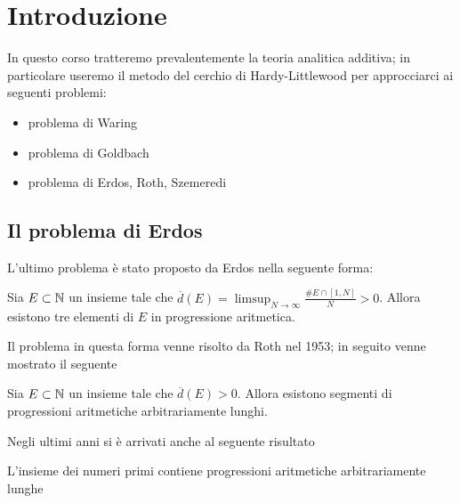 \chapter{Introduzione}
In questo corso tratteremo prevalentemente la teoria analitica additiva; in particolare useremo il metodo del cerchio di Hardy-Littlewood per approcciarci ai seguenti problemi:
\begin{itemize}
    \item problema di Waring
    \item problema di Goldbach
    \item problema di Erdos, Roth, Szemeredi
\end{itemize}
\section{Il problema di Erdos}
L'ultimo problema è stato proposto da Erdos nella seguente forma:
\begin{congettura}[Erdos]
    Sia $E\subset\mathbb{N}$ un insieme tale che $\overline d(E)=\limsup_{N\to\infty}\frac{\# E\cap[1,N]}{N}>0$. Allora esistono tre elementi di $E$ in progressione aritmetica.
\end{congettura}
Il problema in questa forma venne risolto da Roth nel 1953; in seguito venne mostrato il seguente
\begin{theorem}[Szemeredi, 1975]
    Sia $E\subset\mathbb{N}$ un insieme tale che $\overline d(E)>0$. Allora esistono segmenti di progressioni aritmetiche arbitrariamente lunghi.
\end{theorem}
Negli ultimi anni si è arrivati anche al seguente risultato
\begin{theorem}
    L'insieme dei numeri primi contiene progressioni aritmetiche arbitrariamente lunghe
\end{theorem}


